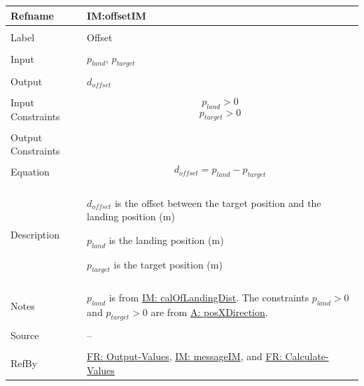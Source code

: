 \documentclass[12pt]{article}
\begin{document}
\noindent \begin{minipage}{\textwidth}
\begin{tabular}{p{} p{}}
\toprule \textbf{Refname} & \textbf{IM:offsetIM}
\label{IM:offsetIM}
\\ \midrule \\
Label & Offset
\\ \midrule \\
Input & ${p_{land}}$, ${p_{target}}$
\\ \midrule \\
Output & ${d_{offset}}$
\\ \midrule \\
Input Constraints & \begin{displaymath}
                    {p_{land}}>0
                    \end{displaymath}
                    \begin{displaymath}
                    {p_{target}}>0
                    \end{displaymath}
\\ \midrule \\
Output Constraints & 
\\ \midrule \\
Equation & \begin{displaymath}
           {d_{offset}}={p_{land}}-{p_{target}}
           \end{displaymath}
\\ \midrule \\
Description & \begin{symbDescription}
              \item{${d_{offset}}$ is the offset between the target position and the landing position (m)}
              \item{${p_{land}}$ is the landing position (m)}
              \item{${p_{target}}$ is the target position (m)}
              \end{symbDescription}
\\ \midrule \\
Notes & ${p_{land}}$ is from \hyperref[IM:calOfLandingDist]{IM: calOfLandingDist}.
        The constraints ${p_{land}}>0$ and ${p_{target}}>0$ are from \hyperref[posXDirection]{A: posXDirection}.
\\ \midrule \\
Source & --
\\ \midrule \\
RefBy & \hyperref[outputValues]{FR: Output-Values}, \hyperref[IM:messageIM]{IM: messageIM}, and \hyperref[calcValues]{FR: Calculate-Values}
\\ \bottomrule \end{tabular}
\end{minipage}
\par~
\end{document}
